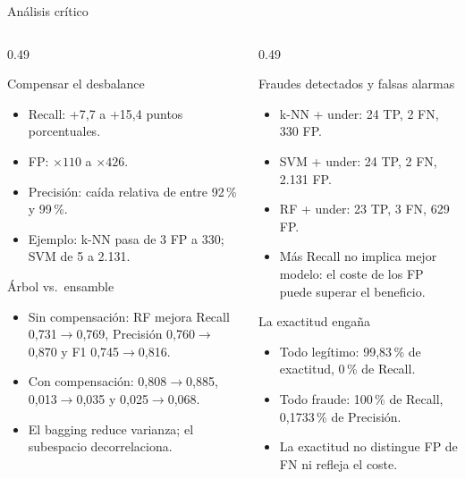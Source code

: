 \documentclass[aspectratio=169,11pt]{beamer}
\begin{document}
\begin{frame}{Análisis crítico}
  \begin{columns}[T]
    \begin{column}{0.49\textwidth}
      \begin{block}{Compensar el desbalance}
        \scriptsize
        \begin{itemize}
          \item Recall: +7,7 a +15,4 puntos porcentuales.
          \item FP: \(\times 110\) a \(\times 426\).
          \item Precisión: caída relativa de entre 92\,\% y 99\,\%.
          \item Ejemplo: k-NN pasa de 3 FP a 330; SVM de 5 a 2.131.
        \end{itemize}
      \end{block}
      \begin{block}{Árbol vs.\ ensamble}
        \scriptsize
        \begin{itemize}
          \item Sin compensación: RF mejora Recall 0,731\(\to\)0,769,
                Precisión 0,760\(\to\)0,870 y F1 0,745\(\to\)0,816.
          \item Con compensación: 0,808\(\to\)0,885,
                0,013\(\to\)0,035 y 0,025\(\to\)0,068.
          \item El bagging reduce varianza; el subespacio decorrelaciona.
        \end{itemize}
      \end{block}
    \end{column}
    \begin{column}{0.49\textwidth}
      \begin{block}{Fraudes detectados y falsas alarmas}
        \scriptsize
        \begin{itemize}
          \item k-NN + under: 24 TP, 2 FN, 330 FP.
          \item SVM + under: 24 TP, 2 FN, 2.131 FP.
          \item RF + under: 23 TP, 3 FN, 629 FP.
          \item Más Recall no implica mejor modelo: el coste de los FP
                puede superar el beneficio.
        \end{itemize}
      \end{block}
      \begin{block}{La exactitud engaña}
        \scriptsize
        \begin{itemize}
          \item Todo legítimo: 99,83\,\% de exactitud, 0\,\% de Recall.
          \item Todo fraude: 100\,\% de Recall, 0,1733\,\% de Precisión.
          \item La exactitud no distingue FP de FN ni refleja el coste.
        \end{itemize}
      \end{block}
    \end{column}
  \end{columns}
\end{frame}
\end{document}
